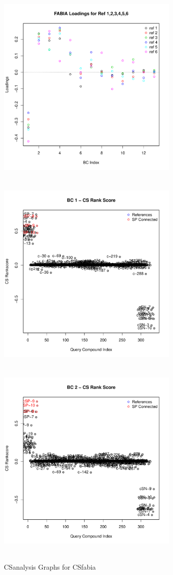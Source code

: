\documentclass[a4paper]{article}\usepackage[]{graphicx}\usepackage[]{color}
\newenvironment{knitrout}{}{} %
\begin{document}
\begin{knitrout}
\begin{figure}[H]
\includegraphics[width=9cm,height=10cm]{figure/FABIA-1} 
\includegraphics[width=9cm,height=10cm]{figure/FABIA-2} 
\includegraphics[width=9cm,height=10cm]{figure/FABIA-3} \hfill{}

\caption[CSanalysis Graphs for CSfabia]{CSanalysis Graphs for CSfabia}\label{fig:FABIA}
\end{figure}


\end{knitrout}
\end{document}
